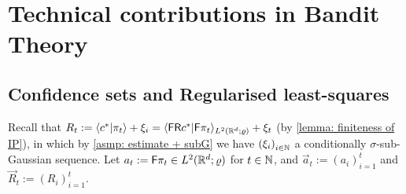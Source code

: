 
\section{Technical contributions in Bandit Theory}\label{app: technical details} %

\subsection{Confidence sets and Regularised least-squares}\label{subsec: conf sets and RLS}


Recall that $R_t:=\langle c^*\vert \pi_t\rangle +\xi_i=\langle \mathsf{F}\mathsf{R} c^*\vert \mathsf{F} \pi_t\rangle_{L^2(\mathbb{R}^d;\varrho)} + \xi_t$ (by \cref{lemma: finiteness of IP}), in which by \cref{asmp: estimate + subG} we have ${(\xi_i)}_{i\in\mathbb{N}}$ a conditionally $\sigma$-sub-Gaussian sequence. Let $a_t:=\mathsf{F}\pi_t\in L^2(\mathbb{R}^d;\varrho)$ for $t\in\mathbb{N}$, and $\vec{a}_t:={(a_i)}_{i=1}^t$ and $\vec{R}_t:={(R_i)}_{i=1}^t$.

